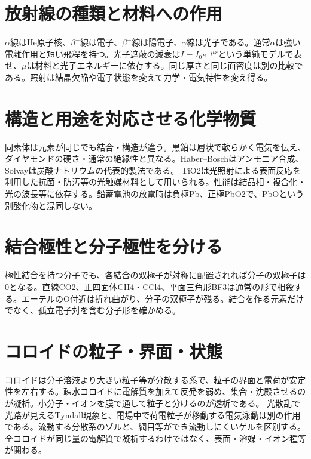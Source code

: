 \section{放射線の種類と材料への作用}
\label{theory:basicchem:radiation}
\(\alpha\)線はHe原子核、\(\beta^-\)線は電子、\(\beta^+\)線は陽電子、\(\gamma\)線は光子である。通常\(\alpha\)は強い電離作用と短い飛程を持つ。光子遮蔽の減衰は\(I=I_0e^{-\mu x}\)という単純モデルで表せ、\(\mu\)は材料と光子エネルギーに依存する\autocite{finish56_radiation}。同じ厚さと同じ面密度は別の比較である。照射は結晶欠陥や電子状態を変えて力学・電気特性を変え得る。

\section{構造と用途を対応させる化学物質}
\label{theory:basicchem:substances}
同素体は元素が同じでも結合・構造が違う。黒鉛は層状で軟らかく電気を伝え、ダイヤモンドの硬さ・通常の絶縁性と異なる。Haber--Boschはアンモニア合成、Solvayは炭酸ナトリウムの代表的製法である。
TiO2は光照射による表面反応を利用した抗菌・防汚等の光触媒材料として用いられる\autocite{finish56_titania}。性能は結晶相・複合化・光の波長等に依存する。鉛蓄電池の放電時は負極Pb、正極PbO2で、PbOという別酸化物と混同しない\autocite{openstax_batteries}。

\section{結合極性と分子極性を分ける}
\label{theory:basicchem:polarity}
極性結合を持つ分子でも、各結合の双極子が対称に配置されれば分子の双極子は0となる\autocite{finish56_polarity}。直線CO2、正四面体CH4・CCl4、平面三角形BF3は通常の形で相殺する。エーテルのO付近は折れ曲がり、分子の双極子が残る。結合を作る元素だけでなく、孤立電子対を含む分子形を確かめる。

\section{コロイドの粒子・界面・状態}
\label{theory:basicchem:colloids}
コロイドは分子溶液より大きい粒子等が分散する系で、粒子の界面と電荷が安定性を左右する。疎水コロイドに電解質を加えて反発を弱め、集合・沈殿させるのが凝析。小分子・イオンを膜で通して粒子と分けるのが透析である\autocite{openstax_colloids}。
光散乱で光路が見えるTyndall現象と、電場中で荷電粒子が移動する電気泳動は別の作用である。流動する分散系のゾルと、網目等ができ流動しにくいゲルを区別する。全コロイドが同じ量の電解質で凝析するわけではなく、表面・溶媒・イオン種等が関わる。
